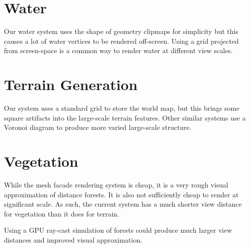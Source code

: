 \section{Water}

Our water system uses the shape of geometry clipmaps for simplicity but this causes a lot of water vertices to be rendered off-screen.
Using a grid projected from screen-space is a common way to render water at different view scales.


\section{Terrain Generation}

Our system uses a standard grid to store the world map, but this brings some square artifacts into the large-scale terrain features.
Other similar systems use a Voronoi diagram to produce more varied large-scale structure.


\section{Vegetation}

While the mesh facade rendering system is cheap, it is a very rough visual approximation of distance forests.
It is also not sufficiently cheap to render at significant scale.
As such, the current system has a much shorter view distance for vegetation than it does for terrain.

Using a GPU ray-cast simulation of forests could produce much larger view distances and improved visual approximation. \cite{terraintreecast}

